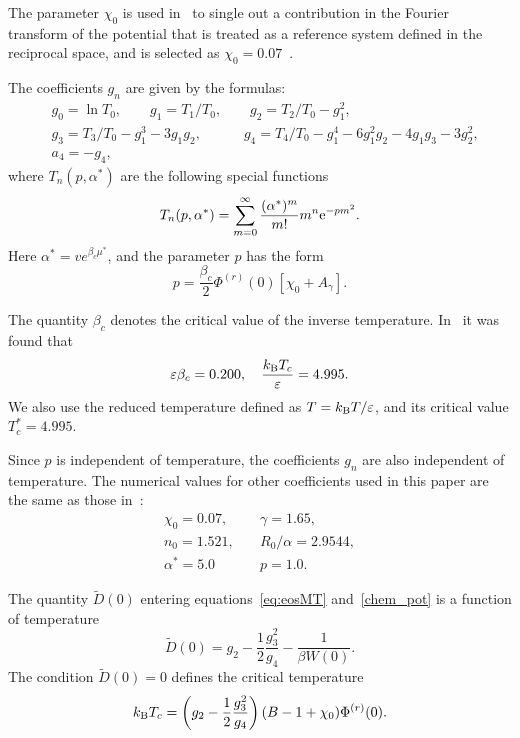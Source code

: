 \documentclass[12pt]{article}
\begin{document}
	The parameter $\chi_0$ is used in~\cite{KozlovskiiDobush2020} to single out a contribution in the Fourier transform of the potential that is treated as a reference system defined in the reciprocal space, and is selected as $\chi_0 = 0.07$~\cite[see Eq.(24)]{KozlovskiiDobush2020}.
	
	The coefficients $g_n$ are given by the formulas:
	\begin{align}
		& g_0 = \ln T_0, \qquad g_1 = T_1/T_0, \qquad g_2 = T_2/T_0 - g_1^2,  \nonumber \\
		& g_3 = T_3/T_0 - g_1^3 - 3g_1 g_2, \quad \qquad  g_4 = T_4/T_0 - g_1^4 - 6 g_1^2 g_2 - 4 g_1 g_3 - 3 g_2^2, \nonumber\\
		& a_4 = -g_4,
	\end{align}
	where $T_n(p,\alpha^*)$ are the following special functions
	\begin{equation}
		T_n(p,\alpha^*) = \sum_{m=0}^{\infty} \frac{(\alpha^*)^m}{m!} m^n {\rm e}^{-pm^2}.
	\end{equation}
	Here $\alpha^*=v e^{\beta_c\mu^*}$, and the parameter $p$ has the form
	\begin{equation}
		p = \frac{\beta_c}{2} \Phi^{(r)}(0) [\chi_0 + A_\gamma].
	\end{equation} 
	
	The quantity $\beta_c$ denotes the critical value of the inverse temperature. In~\cite[see Eq.(31)]{KozlovskiiDobush2020} it was found that
	\begin{equation*}
		\varepsilon\beta_c = 0.200, \quad \frac{k_{\rm B} T_c}{\varepsilon} = 4.995.
	\end{equation*}
	We also use the reduced temperature defined as $T = k_{\rm B}T/\varepsilon$, and its critical value $T^*_c = 4.995.$
	
	Since $p$ is independent of temperature, the coefficients $g_n$ are also independent of temperature. The numerical values for other coefficients used in this paper are the same as those in~\cite[see Eqs.(5), (23), and (24)]{KozlovskiiDobush2020}:
	\begin{eqnarray}
		\label{params}
		\chi_0 = 0.07, & \quad \gamma = 1.65, \nonumber\\
		n_0 = 1.521, & \quad R_0/\alpha = 2.9544, \nonumber\\
		\alpha^* = 5.0 & \quad p = 1.0.
	\end{eqnarray}
	
	The quantity $\tilde D(0)$ entering equations~\eqref{eq:eosMT} and~\eqref{chem_pot} is a function of temperature
	\begin{equation}
	\label{def:D0}
	\tilde D(0) = g_2 - \frac{1}{2} \frac{g_3^2}{g_4} - \frac{1}{\beta W(0)}.
	\end{equation}
	The condition $\tilde{D}(0) = 0$ defines the critical temperature~\cite[see Eq.(31)]{KozlovskiiDobush2020}
	\begin{equation}
		k_{\rm B}T_c = \left(g_2 - \frac{1}{2} \frac{g_3^2}{g_4} \right) (B - 1 + \chi_0) \Phi^{(r)}(0).
	\end{equation}  
	
\end{document}
